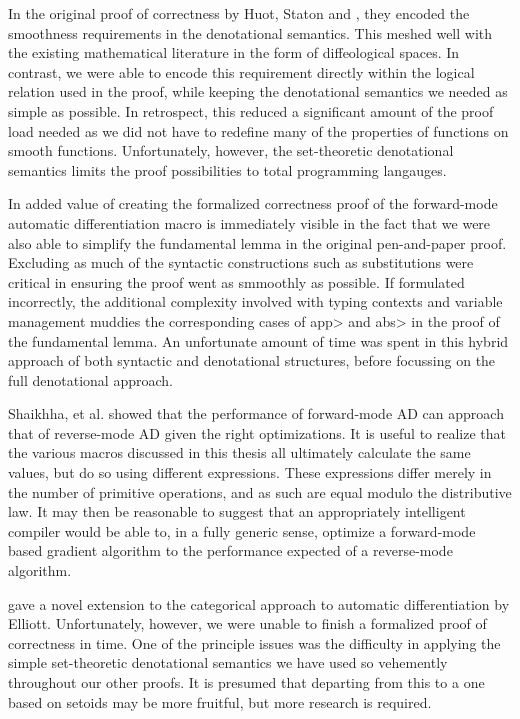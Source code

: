 In the original proof of correctness by Huot, Staton and \Vakar{}\cite{huot2020correctness}, they encoded the smoothness requirements in the denotational semantics.
This meshed well with the existing mathematical literature in the form of diffeological spaces.
In contrast, we were able to encode this requirement directly within the logical relation used in the proof, while keeping the denotational semantics we needed as simple as possible.
In retrospect, this reduced a significant amount of the proof load needed as we did not have to redefine many of the properties of functions on smooth functions.
Unfortunately, however, the set-theoretic denotational semantics limits the proof possibilities to total programming langauges.

In added value of creating the formalized correctness proof of the forward-mode automatic differentiation macro is immediately visible in the fact that we were also able to simplify the fundamental lemma in the original pen-and-paper proof.
Excluding as much of the syntactic constructions such as substitutions were critical in ensuring the proof went as smmoothly as possible.
If formulated incorrectly, the additional complexity involved with typing contexts and variable management muddies the corresponding cases of \<app> and \<abs> in the proof of the fundamental lemma.
An unfortunate amount of time was spent in this hybrid approach of both syntactic and denotational structures, before focussing on the full denotational approach.

Shaikhha, et al.\cite{Shaikha2019} showed that the performance of forward-mode AD can approach that of reverse-mode AD given the right optimizations.
It is useful to realize that the various macros discussed in this thesis all ultimately calculate the same values, but do so using different expressions.
These expressions differ merely in the number of primitive operations, and as such are equal modulo the distributive law.
It may then be reasonable to suggest that an appropriately intelligent compiler would be able to, in a fully generic sense, optimize a forward-mode based gradient algorithm to the performance expected of a reverse-mode algorithm.

\Vakar{}\cite{vkr2020reverse} gave a novel extension to the categorical approach to automatic differentiation by Elliott\cite{Elliott-2018-ad-icfp}.
Unfortunately, however, we were unable to finish a formalized proof of correctness in time.
One of the principle issues was the difficulty in applying the simple set-theoretic denotational semantics we have used so vehemently throughout our other proofs.
It is presumed that departing from this to a one based on setoids may be more fruitful, but more research is required.
